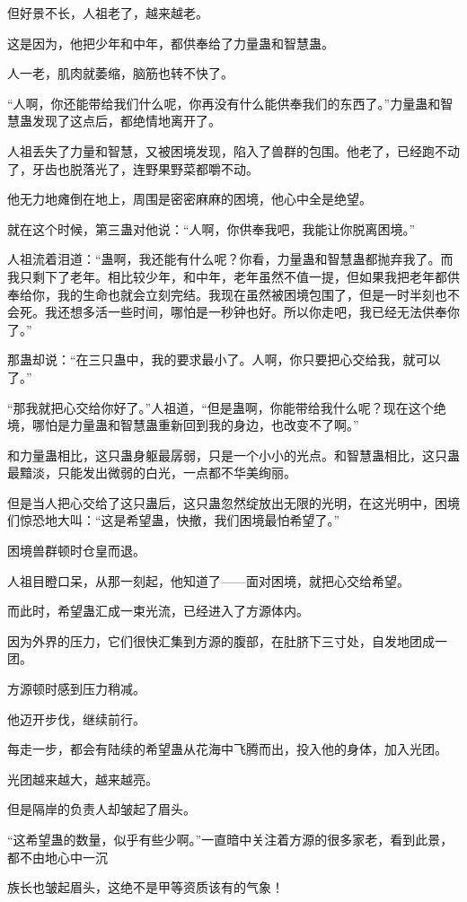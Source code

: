 \begin{this_body}
但好景不长，人祖老了，越来越老。

这是因为，他把少年和中年，都供奉给了力量蛊和智慧蛊。

人一老，肌肉就萎缩，脑筋也转不快了。

“人啊，你还能带给我们什么呢，你再没有什么能供奉我们的东西了。”力量蛊和智慧蛊发现了这点后，都绝情地离开了。

人祖丢失了力量和智慧，又被困境发现，陷入了兽群的包围。他老了，已经跑不动了，牙齿也脱落光了，连野果野菜都嚼不动。

他无力地瘫倒在地上，周围是密密麻麻的困境，他心中全是绝望。

就在这个时候，第三蛊对他说：“人啊，你供奉我吧，我能让你脱离困境。”

人祖流着泪道：“蛊啊，我还能有什么呢？你看，力量蛊和智慧蛊都抛弃我了。而我只剩下了老年。相比较少年，和中年，老年虽然不值一提，但如果我把老年都供奉给你，我的生命也就会立刻完结。我现在虽然被困境包围了，但是一时半刻也不会死。我还想多活一些时间，哪怕是一秒钟也好。所以你走吧，我已经无法供奉你了。”

那蛊却说：“在三只蛊中，我的要求最小了。人啊，你只要把心交给我，就可以了。”

“那我就把心交给你好了。”人祖道，“但是蛊啊，你能带给我什么呢？现在这个绝境，哪怕是力量蛊和智慧蛊重新回到我的身边，也改变不了啊。”

和力量蛊相比，这只蛊身躯最孱弱，只是一个小小的光点。和智慧蛊相比，这只蛊最黯淡，只能发出微弱的白光，一点都不华美绚丽。

但是当人把心交给了这只蛊后，这只蛊忽然绽放出无限的光明，在这光明中，困境们惊恐地大叫：“这是希望蛊，快撤，我们困境最怕希望了。”

困境兽群顿时仓皇而退。

人祖目瞪口呆，从那一刻起，他知道了——面对困境，就把心交给希望。

而此时，希望蛊汇成一束光流，已经进入了方源体内。

因为外界的压力，它们很快汇集到方源的腹部，在肚脐下三寸处，自发地团成一团。

方源顿时感到压力稍减。

他迈开步伐，继续前行。

每走一步，都会有陆续的希望蛊从花海中飞腾而出，投入他的身体，加入光团。

光团越来越大，越来越亮。

但是隔岸的负责人却皱起了眉头。

“这希望蛊的数量，似乎有些少啊。”一直暗中关注着方源的很多家老，看到此景，都不由地心中一沉

族长也皱起眉头，这绝不是甲等资质该有的气象！


\end{this_body}

